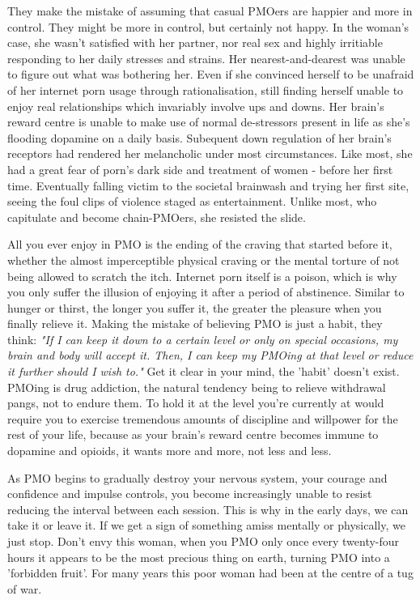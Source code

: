 \documentclass[easypeasy]{subfiles}
\begin{document}
They make the mistake of assuming that casual PMOers are happier and more in control. They might be more in control, but certainly not happy. In the woman's case, she wasn't satisfied with her partner, nor real sex and highly irritiable responding to her daily stresses and strains. Her nearest-and-dearest was unable to figure out what was bothering her. Even if she convinced herself to be unafraid of her internet porn usage through rationalisation, still finding herself unable to enjoy real relationships which invariably involve ups and downs. Her brain's reward centre is unable to make use of normal de-stressors present in life as she's flooding dopamine on a daily basis. Subequent down regulation of her brain's receptors had rendered her melancholic under most circumstances. Like most, she had a great fear of porn's dark side and treatment of women - before her first time. Eventually falling victim to the societal brainwash and trying her first site, seeing the foul clips of violence staged as entertainment. Unlike most, who capitulate and become chain-PMOers, she resisted the slide.

All you ever enjoy in PMO is the ending of the craving that started before it, whether the almost imperceptible physical craving or the mental torture of not being allowed to scratch the itch. Internet porn itself is a poison, which is why you only suffer the illusion of enjoying it after a period of abstinence. Similar to hunger or thirst, the longer you suffer it, the greater the pleasure when you finally relieve it. Making the mistake of believing PMO is just a habit, they think: \textit{"If I can keep it down to a certain level or only on special occasions, my brain and body will accept it. Then, I can keep my PMOing at that level or reduce it further should I wish to."} Get it clear in your mind, the 'habit' doesn't exist. PMOing is drug addiction, the natural tendency being to relieve withdrawal pangs, not to endure them. To hold it at the level you're currently at would require you to exercise tremendous amounts of discipline and willpower for the rest of your life, because as your brain's reward centre becomes immune to dopamine and opioids, it wants more and more, not less and less. 

As PMO begins to gradually destroy your nervous system, your courage and confidence and impulse controls, you become increasingly unable to resist reducing the interval between each session. This is why in the early days, we can take it or leave it. If we get a sign of something amiss mentally or physically, we just stop. Don't envy this woman, when you PMO only once every twenty-four hours it appears to be the most precious thing on earth, turning PMO into a 'forbidden fruit'. For many years this poor woman had been at the centre of a tug of war.
\end{document}
